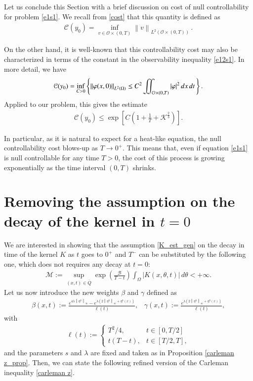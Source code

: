 \documentclass[preprint,1p]{elsarticle}
\newcommand{\D}{\displaystyle}
\newcommand{\norm}[2]{\left\|#1\right\|_{#2}}
\newcommand{\intd}{\displaystyle\int \kern -7pt \int}
\begin{document}
Let us conclude this Section with a brief discussion on cost of null controllability for problem \eqref{e1s1}. We recall from \eqref{cost} that this quantity is defined as 
\begin{align*}
	\mathcal C(y_0)=\D\inf_{v\in{\mathcal O\times(0,T)}}\norm{v}{L^2(\mathcal O\times(0,T))}\,.
\end{align*}

On the other hand, it is well-known that this controllability cost may also be characterized in terms of the constant in the observability inequality \eqref{e12s1}. In more detail, we have 
\begin{align*}
	\mathcal C(y_0)=\inf_{C>0}\left\{\norm{\varphi(x,0)}{L^2(\Omega)} \leq C^2 \intd_{{ \mathcal O}\times(0,T)}|\varphi|^{2}\,dx\,dt\,\right\}.
\end{align*}
Applied to our problem, this gives the estimate
\begin{align*}
	\mathcal C(y_0)\leq\exp\left[C\left(1+\frac{1}{T}+\mathcal{K}^{\frac 23}\right)\right].
\end{align*}

In particular, as it is natural to expect for a heat-like equation, the null controllability cost blows-up as $T\to 0^+$. This means that, even if equation \eqref{e1s1} is null controllable for any time $T>0$, the cost of this process is growing exponentially as the time interval $(0,T)$ shrinks.

\section{Removing the assumption on the decay of the kernel in $t=0$}\label{decay_sec}

We are interested in showing that the assumption \eqref{K_est_gen} on the decay in time of the kernel $K$ as $t$ goes to $0^+$ and $T^-$ can be substituted by the following one, which does not requires any decay at $t=0$:
\begin{align}\label{K_est_weak}
	\mathcal{M}:=\sup_{(x,t)\in\overline{Q}}\exp\left(\frac{\mathcal{B}}{T-t}\right)\int_{\Omega} |K(x,\theta,t)|\,d\theta <+\infty.
\end{align}
Let us now introduce the new weights $\beta$ and $\gamma$ defined as
%
\begin{align*}
	\beta(x,t):=\frac{e^{4\lambda\norm{\eta^0}{\infty}}-e^{\lambda\left(2\norm{\eta^0}{\infty}+\eta^0(x)\right)}}{\ell(t)}, \;\;\; \gamma(x,t):=\frac{e^{\lambda\left(2\norm{\eta^0}{\infty}+\eta^0(x)\right)}}{\ell(t)},
\end{align*}
with
\begin{align*}
	\ell(t):=\begin{cases}
		\D T^2/4, & t\in\left[0,T/2\right]
		\\
		\D t(T-t), & t\in\left[T/2, T\right],
	\end{cases}
\end{align*}
and the parameters $s$ and $\lambda$ are fixed and taken as in Proposition \ref{carleman z_prop}. Then, we can state the following refined version of the Carleman inequality \eqref{carleman z}.
\end{document}
